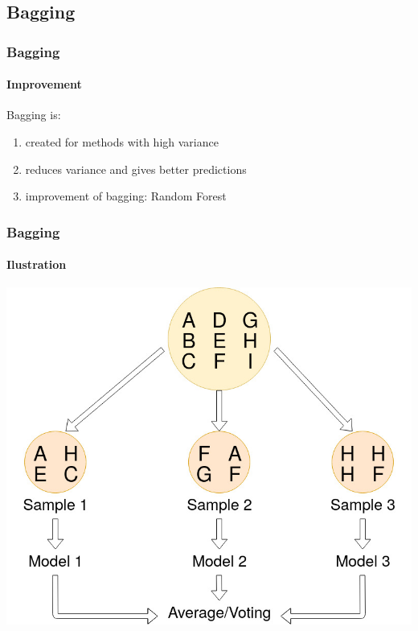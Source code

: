 \subsection{Bagging}

\begin{frame}
    \frametitle{Bagging}
    \framesubtitle{Improvement}
	Bagging is:
    \begin{enumerate}
    \item created for methods with high variance
    \item reduces variance and gives better predictions
    \item improvement of bagging: Random Forest
    \end{enumerate}
    

\end{frame}

\begin{frame}
    \frametitle{Bagging}
  \framesubtitle{Ilustration}

	\begin{center}		
		\includegraphics[height=0.7\textheight]{images/bagging_1.jpg}
	\end{center}

\end{frame}